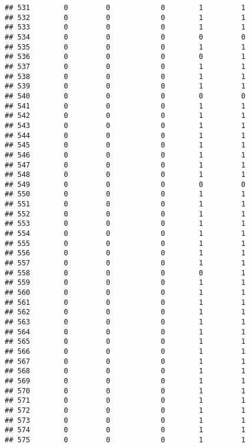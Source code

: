 \documentclass[
]{article}
\begin{document}
\begin{verbatim}
## 531        0         0            0        1         1
## 532        0         0            0        1         1
## 533        0         0            0        1         1
## 534        0         0            0        0         0
## 535        0         0            0        1         1
## 536        0         0            0        0         1
## 537        0         0            0        1         1
## 538        0         0            0        1         1
## 539        0         0            0        1         1
## 540        0         0            0        0         0
## 541        0         0            0        1         1
## 542        0         0            0        1         1
## 543        0         0            0        1         1
## 544        0         0            0        1         1
## 545        0         0            0        1         1
## 546        0         0            0        1         1
## 547        0         0            0        1         1
## 548        0         0            0        1         1
## 549        0         0            0        0         0
## 550        0         0            0        1         1
## 551        0         0            0        1         1
## 552        0         0            0        1         1
## 553        0         0            0        1         1
## 554        0         0            0        1         1
## 555        0         0            0        1         1
## 556        0         0            0        1         1
## 557        0         0            0        1         1
## 558        0         0            0        0         1
## 559        0         0            0        1         1
## 560        0         0            0        1         1
## 561        0         0            0        1         1
## 562        0         0            0        1         1
## 563        0         0            0        1         1
## 564        0         0            0        1         1
## 565        0         0            0        1         1
## 566        0         0            0        1         1
## 567        0         0            0        1         1
## 568        0         0            0        1         1
## 569        0         0            0        1         1
## 570        0         0            0        1         1
## 571        0         0            0        1         1
## 572        0         0            0        1         1
## 573        0         0            0        1         1
## 574        0         0            0        1         1
## 575        0         0            0        1         1

\end{verbatim}
\end{document}
